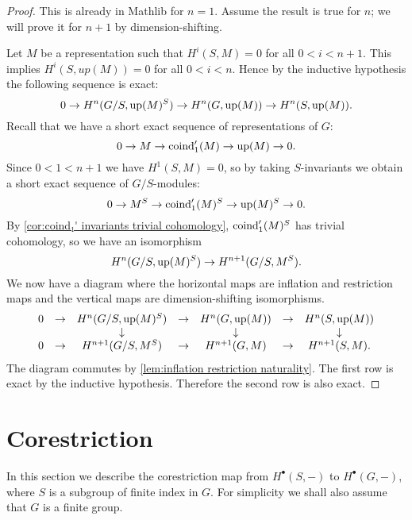 \begin{proof}
	This is already in Mathlib for $n=1$.
	Assume the result is true for $n$; we will prove it for $n+1$
	by dimension-shifting.

	Let $M$ be a representation such that $H^i(S,M)=0$ for all $0 < i < n+1$.
	This implies $H^i(S,up(M)) = 0$ for all $0 < i < n$.
	Hence by the inductive hypothesis the following sequence is exact:
	\[
		0 \to H^n( G/S, \mathrm{up}(M)^S) \to H^n(G, \mathrm{up}(M)) \to H^n(S,\mathrm{up}(M)).
	\]
	Recall that we have a short exact sequence of representations of $G$:
	\[
		0 \to M \to \mathrm{coind}_1'(M) \to \mathrm{up}(M) \to 0.
	\]
	Since $0 < 1 < n+1$ we have $H^1(S,M)=0$,
	so by taking $S$-invariants we obtain a short exact sequence of
	$G/S$-modules:
	\[
		0 \to M^S \to \mathrm{coind}_1'(M)^S \to \mathrm{up}(M)^S \to 0.
	\]
	By \ref{cor:coind₁' invariants trivial cohomology}, $\mathrm{coind}_1'(M)^S$ has trivial cohomology,
	so we have an isomorphism
	\[
		 H^n(G/S, \mathrm{up}(M)^S) \to H^{n+1}(G/S, M^S).
	\]
	We now have a diagram where the horizontal maps are inflation and restriction maps
	and the vertical maps are dimension-shifting isomorphisms.
	\[
		\begin{matrix}
			0 &\to& H^{n}(G/S, \mathrm{up}(M)^S) &\to &H^{n}(G,\mathrm{up}(M)) & \to & H^n(S,\mathrm{up}(M)) \\
			  &   &   \downarrow              &    &  \downarrow         &     &  \downarrow  \\
			0 &\to& H^{n+1}(G/S, M^S) &\to &H^{n+1}(G,M) & \to & H^{n+1}(S,M).
		\end{matrix}
	\]
	The diagram commutes by \ref{lem:inflation restriction naturality}.
	The first row is exact by the inductive hypothesis.
	Therefore the second row is also exact.
\end{proof}




\section{Corestriction}

In this section we describe the corestriction map from $H^\bullet (S,-)$ to $H^\bullet(G,-)$,
where $S$ is a subgroup of finite index in $G$.
For simplicity we shall also assume that $G$ is a finite group.

